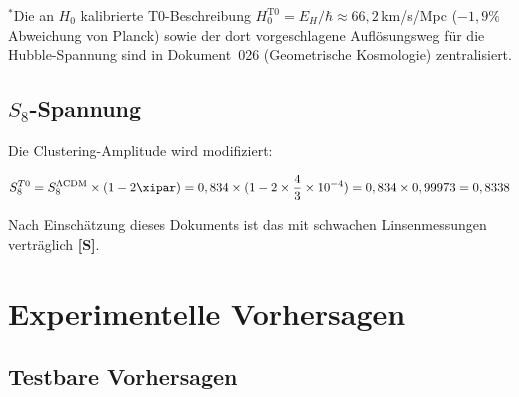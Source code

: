 	\begin{table}[htbp]
		\centering
		\caption{T0-Parameter-Einschränkungen (68\% CL)}
		\label{tab:parameters}
	\end{table}
{$^*$Die an $H_0$ kalibrierte T0-Beschreibung $H_0^{\text{T0}} = E_H/\hbar \approx 66{,}2\,$km/s/Mpc ($-1{,}9\%$ Abweichung von Planck) sowie der dort vorgeschlagene Auflösungsweg für die Hubble-Spannung sind in Dokument~026 (Geometrische Kosmologie) zentralisiert.}
	
	\subsection{$S_8$-Spannung}
	
	Die Clustering-Amplitude wird modifiziert:
	
	\begin{equation}
		S_8^{T0} = S_8^{\Lambda\text{CDM}} \times (1 - 2\xipar) = 0,834 \times (1 - 2 \times \frac{4}{3} \times 10^{-4}) = 0,834 \times 0,99973 = 0,8338
	\end{equation}
	
	Nach Einschätzung dieses Dokuments ist das mit schwachen Linsenmessungen verträglich \textbf{[S]}.
	
	\section{Experimentelle Vorhersagen}
	\label{sec:predictions}
	
	\subsection{Testbare Vorhersagen}
	
